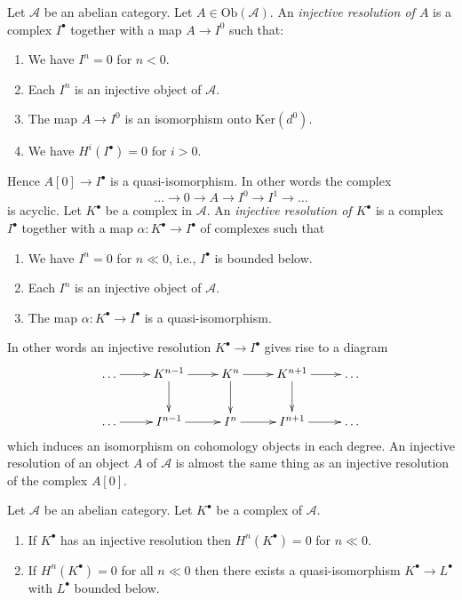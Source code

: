 \begin{definition}
\label{definition-injective-resolution}
Let $\mathcal{A}$ be an abelian category.
Let $A \in \text{Ob}(\mathcal{A})$.
An {\it injective resolution of $A$} is a complex
$I^\bullet$ together with a map $A \to I^0$ such
that:
\begin{enumerate}
\item We have $I^n = 0$ for $n < 0$.
\item Each $I^n$ is an injective object of $\mathcal{A}$.
\item The map $A \to I^0$ is an isomorphism onto $\text{Ker}(d^0)$.
\item We have $H^i(I^\bullet) = 0$ for $i > 0$.
\end{enumerate}
Hence $A[0] \to I^\bullet$ is a quasi-isomorphism.
In other words the complex
$$
\ldots \to 0 \to A \to I^0 \to I^1 \to \ldots
$$
is acyclic.
Let $K^\bullet$ be a complex in $\mathcal{A}$.
An {\it injective resolution of $K^\bullet$} is a complex
$I^\bullet$ together with a map $\alpha : K^\bullet \to I^\bullet$
of complexes such that
\begin{enumerate}
\item We have $I^n = 0$ for $n \ll 0$, i.e., $I^\bullet$ is bounded below.
\item Each $I^n$ is an injective object of $\mathcal{A}$.
\item The map $\alpha : K^\bullet \to I^\bullet$ is a
quasi-isomorphism.
\end{enumerate}
\end{definition}

\noindent
In other words an injective resolution $K^\bullet \to I^\bullet$
gives rise to a diagram
$$
\xymatrix{
\ldots \ar[r] & K^{n - 1} \ar[d] \ar[r] & K^n \ar[d] \ar[r] &
K^{n + 1} \ar[d] \ar[r] & \ldots \\
\ldots \ar[r] & I^{n - 1} \ar[r] & I^n \ar[r] & I^{n + 1} \ar[r] & \ldots
}
$$
which induces an isomorphism on cohomology objects in each degree.
An injective resolution of an object $A$ of $\mathcal{A}$
is almost the same thing as an injective resolution of
the complex $A[0]$.

\begin{lemma}
\label{lemma-cohomology-bounded-below}
Let $\mathcal{A}$ be an abelian category.
Let $K^\bullet$ be a complex of $\mathcal{A}$.
\begin{enumerate}
\item If $K^\bullet$ has an injective resolution then
$H^n(K^\bullet) = 0$ for $n \ll 0$.
\item If $H^n(K^\bullet) = 0$ for all $n \ll 0$ then there
exists a quasi-isomorphism $K^\bullet \to L^\bullet$
with $L^\bullet$ bounded below.
\end{enumerate}
\end{lemma}

